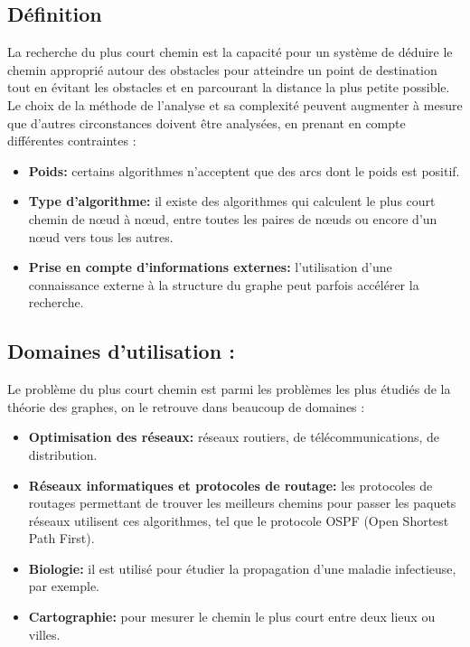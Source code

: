 \subsection{Définition}
La recherche du plus court chemin est la capacité pour un système de déduire le chemin approprié autour des obstacles pour atteindre un point de destination tout en évitant les obstacles et en parcourant la distance la plus petite possible.
Le choix de la méthode de l'analyse et sa complexité peuvent augmenter à mesure que d'autres circonstances doivent être analysées, en prenant en compte différentes contraintes :

\begin{itemize}
	\item \textbf{Poids:} certains algorithmes n'acceptent que des arcs dont le poids est positif.
	\item \textbf{Type d'algorithme:} il existe des algorithmes qui calculent le plus court chemin de nœud à nœud, entre toutes les paires de nœuds ou encore d'un nœud vers tous les autres.
	\item \textbf{Prise en compte d'informations externes:} l'utilisation d'une connaissance externe à la structure du graphe peut parfois accélérer la recherche.
\end{itemize}

\subsection{Domaines d'utilisation :}
Le problème du plus court chemin est parmi les problèmes les plus étudiés de la théorie des graphes, on le retrouve dans beaucoup de domaines :
\begin{itemize}
\item\textbf{Optimisation des réseaux:} réseaux routiers, de télécommunications, de distribution.
\item\textbf{Réseaux informatiques et protocoles de routage: } les protocoles de routages permettant de trouver les meilleurs chemins pour passer les paquets réseaux utilisent ces algorithmes, tel que le protocole OSPF (Open Shortest Path First).
\item\textbf{Biologie:} il est utilisé pour étudier la propagation d'une maladie infectieuse, par exemple.
\item\textbf{Cartographie:} pour mesurer le chemin le plus court entre deux lieux ou villes.
\end{itemize}

